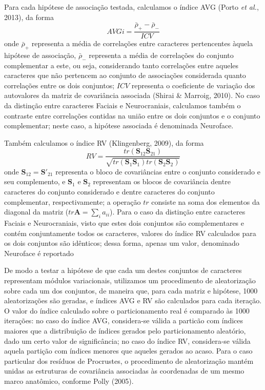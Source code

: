 \documentclass[12pt,]{article}
\begin{document}
Para cada hipótese de associação testada, calculamos o índice AVG (Porto
\emph{et al.}, 2013), da forma
\[ AVGi = \frac {\bar{\rho}_{+} - \bar{\rho}_{-}} {ICV} \] onde
$\bar{\rho}_{+}$ representa a média de correlações entre caracteres
pertencentes àquela hipótese de associação, $\bar{\rho}_{-}$ representa
a média de correlações do conjunto complementar a este, ou seja,
considerando tanto correlações entre aqueles caracteres que não
pertencem ao conjunto de associações considerada quanto correlações
entre os dois conjuntos; $ICV$ representa o coeficiente de variação dos
autovalores da matriz de covariância associada (Shirai \& Marroig,
2010). No caso da distinção entre caracteres Faciais e Neurocraniais,
calculamos também o contraste entre correlações contidas na união entre
os dois conjuntos e o conjunto complementar; neste caso, a hipótese
associada é denominada Neuroface.

Também calculamos o índice RV (Klingenberg, 2009), da forma \[
RV = \frac{tr(\mathbf{S}_{12}\mathbf{S}_{21})}{\sqrt{tr(\mathbf{S}_1 \mathbf{S}_1)tr(\mathbf{S}_2 \mathbf{S}_2)}}
\] onde $\mathbf{S}_{12} = \mathbf{S}'_{21}$ representa o bloco de
covariâncias entre o conjunto considerado e seu complemento, e
$\mathbf{S}_1$ e $\mathbf{S}_2$ representam os blocos de covariância
dentre caracteres do conjunto considerado e dentre caracteres do
conjunto complementar, respectivamente; a operação $tr$ consiste na soma
dos elementos da diagonal da matriz ($tr \mathbf{A} = \sum_i a_{ii}$).
Para o caso da distinção entre caracteres Faciais e Neurocraniais, visto
que estes dois conjuntos são complementares e contém conjuntamente todos
os caracteres, valores do índice RV calculados para os dois conjuntos
são idênticos; dessa forma, apenas um valor, denominado Neuroface é
reportado

De modo a testar a hipótese de que cada um destes conjuntos de
caracteres representam módulos variacionais, utilizamos um procedimento
de aleatorização sobre cada um dos conjuntos, de maneira que, para cada
matriz e hipótese, 1000 aleatorizações são geradas, e índices AVG e RV
são calculados para cada iteração. O valor do índice calculado sobre o
particionamento real é comparado às 1000 iterações: no caso do índice
AVG, considera-se válida a particão com índices maiores que a
distribuição de índices gerados pelo particionamento aleatório, dado um
certo valor de significância; no caso do índice RV, considera-se válida
aquela partição com índices menores que aqueles gerados ao acaso. Para o
caso particular dos resíduos de Procrustes, o procedimento de
aleatorização mantém unidas as estruturas de covariância associadas às
coordenadas de um mesmo marco anatômico, conforme Polly (2005).
\end{document}
